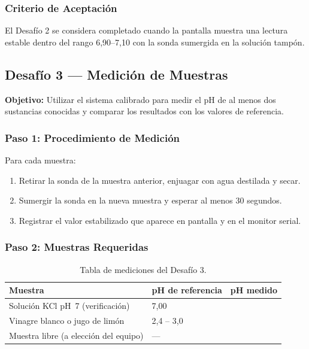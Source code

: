 \documentclass[12pt,leqno]{article}
\begin{document}
\subsubsection*{Criterio de Aceptaci\'on}

El Desaf\'io 2 se considera completado cuando la pantalla muestra una lectura
estable dentro del rango 6,90--7,10 con la sonda sumergida en la soluci\'on tamp\'on.

\bigskip

\subsection{Desaf\'io 3 --- Medici\'on de Muestras}

\textbf{Objetivo:} Utilizar el sistema calibrado para medir el pH de al menos dos
sustancias conocidas y comparar los resultados con los valores de referencia.

\subsubsection*{Paso 1: Procedimiento de Medici\'on}

Para cada muestra:
\begin{enumerate}[(1)]
    \item Retirar la sonda de la muestra anterior, enjuagar con agua destilada
    y secar.
    \item Sumergir la sonda en la nueva muestra y esperar al menos 30 segundos.
    \item Registrar el valor estabilizado que aparece en pantalla y en el monitor
    serial.
\end{enumerate}

\subsubsection*{Paso 2: Muestras Requeridas}

\begin{table}[h]
\centering
\begin{tabular}{|p{5cm}|p{3.5cm}|p{4cm}|}
\hline
\textbf{Muestra} & \textbf{pH de referencia} & \textbf{pH medido} \\
\hline
Soluci\'on KCl pH~7 (verificaci\'on) & 7,00 & \\
\hline
Vinagre blanco o jugo de lim\'on & 2,4 -- 3,0 & \\
\hline
Muestra libre (a elecci\'on del equipo) & --- & \\
\hline
\end{tabular}
\caption{Tabla de mediciones del Desaf\'io 3.}
\end{table}
\end{document}
